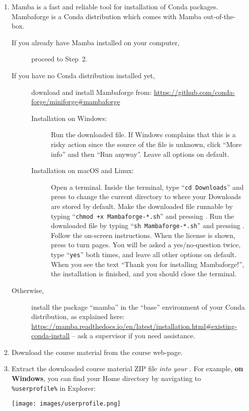 \documentclass[12pt,a4paper]{article}
\begin{document}
\begin{enumerate}
\item Mamba is a fast and reliable tool for installation of Conda packages. Mambaforge is a Conda distribution which comes with Mamba out-of-the-box.
    \begin{description}
        \item[If you already have Mamba installed on your computer,] proceed to Step~2.
        \item[If you have no Conda distribution installed yet,] download and install Mamba\-forge from: \url{https://github.com/conda-forge/miniforge#mambaforge}
        \begin{description}
            \item[Installation on Windows:] Run the downloaded file. If Windows complains that this is a risky action since the source of the file is unknown, click ``More info'' and then ``Run anyway''. Leave all options on default.
            \item[Installation on macOS and Linux:] Open a terminal. Inside the terminal, type ``\texttt{cd Downloads}'' and press \Return to change the current directory to where your Downloads are stored by default. Make the downloaded file runnable by typing ``\texttt{chmod +x Mambaforge-*.sh}'' and pressing \Return. Run the downloaded file by typing ``\texttt{sh Mambaforge-*.sh}'' and pressing \Return. Follow the on-screen instructions. When the license is shown, press \Spacebar to turn pages. You will be asked a yes/no-question twice, type ``\texttt{yes}'' both times, and leave all other options on default. When you see the text ``Thank you for installing Mambaforge!'', the installation is finished, and you should close the terminal.
        \end{description}
        \item[Otherwise,] install the package ``mamba'' in the ``base'' environment of your Conda distribution, as explained here: \url{https://mamba.readthedocs.io/en/latest/installation.html#existing-conda-install} -- ask a supervisor if you need assistance.
    \end{description}
\item Download the course material from the course web-page.
\item Extract the downloaded course material ZIP file \emph{\underline{} into your \underline{}}. \underline{} For example, \textbf{on Windows}, you can find your Home directory by navigating to \texttt{\%userprofile\%} in Explorer:\\[0.5em]
    \begin{minipage}{\linewidth}
        \centering
        \texttt{[image: images/userprofile.png]}
    \end{minipage}
    

\end{enumerate}
\end{document}
